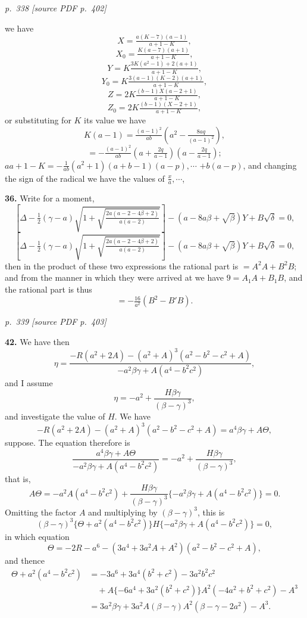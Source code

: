\documentclass[11pt,a4paper]{article}
\newcommand{\pagemarker}[2]{\par\bigskip\noindent\textit{p.~#1 [source PDF p.~#2]}\par\smallskip}
\begin{document}
\clearpage

\pagemarker{338}{402}

we have
\[
X = \tfrac{a(K - 7)(a - 1)}{a + 1 - K},
\]
\[
X_0 = \tfrac{K(a - 7)(a + 1)}{a + 1 - K},
\]
\[
Y = K \tfrac{3K(a^2 - 1) + 2(a + 1)}{a + 1 - K},
\]
\[
Y_0 = K \tfrac{3(a - 1)(K - 2)(a + 1)}{a + 1 - K},
\]
\[
Z = 2K \tfrac{(b - 1)X(a - 2 + 1)}{a + 1 - K},
\]
\[
Z_0 = 2K \tfrac{(b - 1)(X - 2 + 1)}{a + 1 - K},
\]
or substituting for $K$ its value we have
\[
K(a - 1) = \tfrac{(a - 1)^2}{ab}\!\left(a^2 - \tfrac{8aq}{(a - 1)^2}\right),
\]
\[
= -\tfrac{(a - 1)^2}{ab}\!\left(a + \tfrac{2q}{a - 1}\right)\!\left(a - \tfrac{2q}{a - 1}\right);
\]
$a a + 1 - K = -\tfrac{1}{ab}(a^2 + 1)\!\left(a + b - 1\right)(a - p), \cdots$
$+ b\!(a - p)$,
and changing the sign of the radical we have the values of $\tfrac{x}{a}, \cdots$,

\textbf{36.} Write for a moment,
\[
\left[\Delta - \tfrac{1}{2}(\gamma - a)\sqrt{1 + \sqrt{\tfrac{2a(a - 2 - 4\beta + 2)}{a(a - 2)}}}\right] - (a - 8a\beta + \sqrt{\beta})Y + B\sqrt{\delta} = 0,
\]
\[
\left[\Delta - \tfrac{1}{2}(\gamma - a)\sqrt{1 + \sqrt{\tfrac{2a(a - 2 - 4\beta + 2)}{a(a - 2)}}}\right] - (a - 8a\beta + \sqrt{\beta})Y + B\sqrt{\delta} = 0,
\]
then in the product of these two expressions the rational part is $= A^2A + B^2B$; and from the manner in which they were arrived at we have $9 = A_1A + B_1B$, and the rational part is thus
\[
= -\tfrac{16}{a^2}(B^2 - B'B).
\]

\clearpage

\pagemarker{339}{403}

\textbf{42.} We have then
\[
\eta=
\frac{-R(a^2+2A)-(a^2+A)^3(a^2-b^2-c^2+A)}
     {-a^2\beta\gamma+A(a^4-b^2c^2)},
\]
and I assume
\[
\eta=-a^2+\frac{H\beta\gamma}{(\beta-\gamma)^3},
\]
and investigate the value of $H$. We have
\[
-R(a^2+2A)-(a^2+A)^3(a^2-b^2-c^2+A)=a^4\beta\gamma+A\Theta,
\]
suppose. The equation therefore is
\[
\frac{a^4\beta\gamma+A\Theta}
     {-a^2\beta\gamma+A(a^4-b^2c^2)}
=-a^2+\frac{H\beta\gamma}{(\beta-\gamma)^3},
\]
that is,
\[
A\Theta=-a^2A(a^4-b^2c^2)+
\frac{H\beta\gamma}{(\beta-\gamma)^3}\{-a^2\beta\gamma+A(a^4-b^2c^2)\}=0.
\]
Omitting the factor $A$ and multiplying by $(\beta-\gamma)^3$, this is
\[
(\beta-\gamma)^3\{\Theta+a^2(a^4-b^2c^2)\}
H\{-a^2\beta\gamma+A(a^4-b^2c^2)\}=0,
\]
in which equation
\[
\Theta=-2R-a^6-(3a^4+3a^2A+A^2)(a^2-b^2-c^2+A),
\]
and thence
\begin{align*}
\Theta+a^2(a^4-b^2c^2)
&=-3a^6+3a^4(b^2+c^2)-3a^2b^2c^2\\
&\quad +A\{-6a^4+3a^2(b^2+c^2)\}
A^2(-4a^2+b^2+c^2)-A^3\\
&=3a^2\beta\gamma+3a^2A(\beta-\gamma)
A^2(\beta-\gamma-2a^2)-A^3 .
\end{align*}
\end{document}
